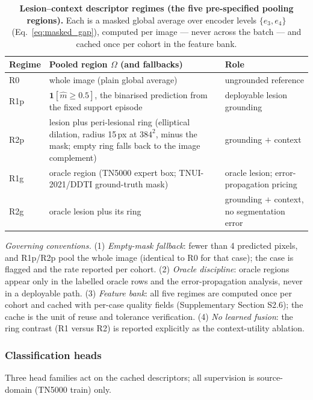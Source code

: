 \documentclass[jimh,article,submit,moreauthors,pdftex]{Definitions/tsp}
\begin{document}
\begin{table}[!ht]
\centering
\caption{\textbf{Lesion--context descriptor regimes (the five
pre-specified pooling regions).} Each is a masked global average over
encoder levels $\{e_3,e_4\}$ (Eq.~\eqref{eq:masked_gap}), computed per
image --- never across the batch --- and cached once per cohort in the
feature bank.}
\label{tab:regimes}
\begin{tabular}{@{}lp{72mm}p{34mm}@{}}
\toprule
Regime & Pooled region $\Omega$ (and fallbacks) & Role \\
\midrule
R0 & whole image (plain global average) & ungrounded reference \\
R1p & $\mathbf{1}[\hat m \geq 0.5]$, the binarised prediction from the
fixed support episode & deployable lesion grounding \\
R2p & lesion plus peri-lesional ring (elliptical dilation, radius
15\,px at $384^2$, minus the mask; empty ring falls back to the image
complement) & grounding $+$ context \\
R1g & oracle region (TN5000 expert box; TNUI-2021/DDTI ground-truth
mask) & oracle lesion; error-propagation pricing \\
R2g & oracle lesion plus its ring & grounding $+$ context, no
segmentation error \\
\bottomrule
\end{tabular}

{\footnotesize \emph{Governing conventions.} (1) \emph{Empty-mask
fallback}: fewer than 4 predicted pixels, and R1p/R2p pool the whole
image (identical to R0 for that case); the case is flagged and the
rate reported per cohort. (2) \emph{Oracle discipline}: oracle regions
appear only in the labelled oracle rows and the error-propagation
analysis, never in a deployable path. (3) \emph{Feature bank}: all five
regimes are computed once per cohort and cached with per-case quality
fields (Supplementary Section S2.6); the cache is the unit of reuse and
tolerance verification. (4) \emph{No learned fusion}: the ring contrast
(R1 versus R2) is reported explicitly as the context-utility
ablation.}
\end{table}

\subsubsection{Classification heads}
\label{subsubsec:classification_heads}

Three head families act on the cached descriptors; all supervision is
source-domain (TN5000 train) only.
\end{document}
